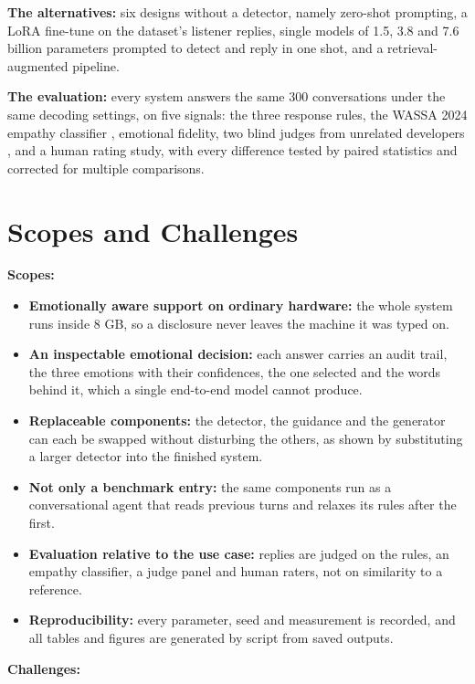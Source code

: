 \textbf{The alternatives:} six designs without a detector, namely zero-shot prompting, a LoRA fine-tune on the dataset's listener replies, single models of 1.5, 3.8 and 7.6 billion parameters prompted to detect and reply in one shot, and a retrieval-augmented pipeline.

\textbf{The evaluation:} every system answers the same 300 conversations under the same decoding settings, on five signals: the three response rules, the WASSA 2024 empathy classifier \cite{giorgi2024wassa,yang2024hyy33}, emotional fidelity, two blind judges from unrelated developers \cite{zheng2023judge,verga2024}, and a human rating study, with every difference tested by paired statistics and corrected for multiple comparisons.

\section{Scopes and Challenges}
\label{sec:1.6}

\textbf{Scopes:}

\begin{itemize}
  \item \textbf{Emotionally aware support on ordinary hardware: }the whole system runs inside 8 GB, so a disclosure never leaves the machine it was typed on.
  \item \textbf{An inspectable emotional decision:} each answer carries an audit trail, the three emotions with their confidences, the one selected and the words behind it, which a single end-to-end model cannot produce.
  \item \textbf{Replaceable components: }the detector, the guidance and the generator can each be swapped without disturbing the others, as shown by substituting a larger detector into the finished system.
  \item \textbf{Not only a benchmark entry: }the same components run as a conversational agent that reads previous turns and relaxes its rules after the first.
  \item \textbf{Evaluation relative to the use case:} replies are judged on the rules, an empathy classifier, a judge panel and human raters, not on similarity to a reference.
  \item \textbf{Reproducibility: }every parameter, seed and measurement is recorded, and all tables and figures are generated by script from saved outputs.
\end{itemize}

\textbf{Challenges:}

